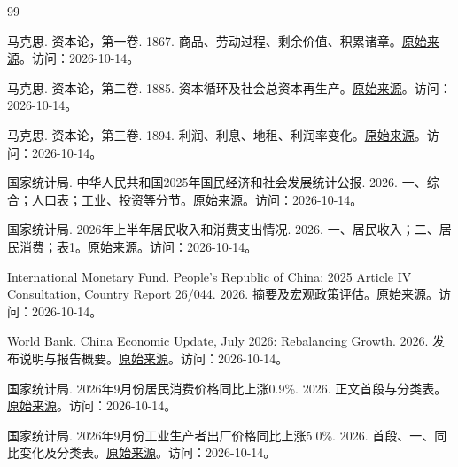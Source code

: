 \documentclass[UTF8,fontset=fandol,zihao=-4,oneside,openany]{ctexbook}
\begin{document}
\begin{thebibliography}{99}

\small\sloppy

 马克思. 资本论，第一卷. 1867. 商品、劳动过程、剩余价值、积累诸章。\href{\detokenize{https://www.marxists.org/chinese/marx/capital/index.htm}}{原始来源}。访问：2026-10-14。

 马克思. 资本论，第二卷. 1885. 资本循环及社会总资本再生产。\href{\detokenize{https://www.marxists.org/chinese/marx/capital/marxist.org-chinese-marx-capital-vol2-01.htm}}{原始来源}。访问：2026-10-14。

 马克思. 资本论，第三卷. 1894. 利润、利息、地租、利润率变化。\href{\detokenize{https://www.marxists.org/chinese/marx/capital/marxist.org-chinese-marx-capital-vol3-01.htm}}{原始来源}。访问：2026-10-14。

 国家统计局. 中华人民共和国2025年国民经济和社会发展统计公报. 2026. 一、综合；人口表；工业、投资等分节。\href{\detokenize{https://www.stats.gov.cn/sj/zxfb/202602/t20260228_1962662.html}}{原始来源}。访问：2026-10-14。

 国家统计局. 2026年上半年居民收入和消费支出情况. 2026. 一、居民收入；二、居民消费；表1。\href{\detokenize{https://www.stats.gov.cn/sj/zxfbhjd/202607/t20260715_1964129.html}}{原始来源}。访问：2026-10-14。

 International Monetary Fund. People’s Republic of China: 2025 Article IV Consultation, Country Report 26/044. 2026. 摘要及宏观政策评估。\href{\detokenize{https://www.imf.org/en/publications/cr/issues/2026/02/17/peoples-republic-of-china-2025-article-iv-consultation-press-release-staff-report-and-574028}}{原始来源}。访问：2026-10-14。

 World Bank. China Economic Update, July 2026: Rebalancing Growth. 2026. 发布说明与报告概要。\href{\detokenize{https://www.worldbank.org/en/news/press-release/2026/07/07/rebalancing-growth-china-economic-update}}{原始来源}。访问：2026-10-14。

 国家统计局. 2026年9月份居民消费价格同比上涨0.9\%. 2026. 正文首段与分类表。\href{\detokenize{https://www.stats.gov.cn/sj/zxfbhjd/202610/t20261014_1965477.html}}{原始来源}。访问：2026-10-14。

 国家统计局. 2026年9月份工业生产者出厂价格同比上涨5.0\%. 2026. 首段、一、同比变化及分类表。\href{\detokenize{https://www.stats.gov.cn/sj/zxfbhjd/202610/t20261014_1965476.html}}{原始来源}。访问：2026-10-14。


\end{thebibliography}
\end{document}
